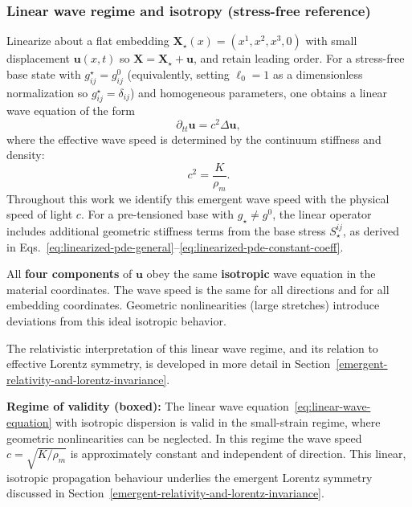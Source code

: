 \subsubsection{Linear wave regime and isotropy (stress-free reference)}\label{linear-wave-regime-and-isotropy}

Linearize about a flat embedding $\mathbf X_\star(x)=(x^1,x^2,x^3,0)$ with small displacement $\mathbf u(x,t)$ so $\mathbf X=\mathbf X_\star+\mathbf u$, and retain leading order. For a stress-free base state with $g^\star_{ij}=g^0_{ij}$ (equivalently, setting $\ell_0=1$ as a dimensionless normalization so $g^\star_{ij}=\delta_{ij}$) and homogeneous parameters, one obtains a linear wave equation of the form
\begin{equation}
\partial_{tt}\mathbf u = c^2\Delta\mathbf u,
\label{eq:linear-wave-equation}
\end{equation}
where the effective wave speed is determined by the continuum stiffness and density:
\begin{equation}
c^2 = \frac{K}{\rho_m}.
\end{equation}
Throughout this work we identify this emergent wave speed with the physical speed of light $c$.
For a pre-tensioned base with $g_\star\neq g^0$, the linear operator includes additional geometric stiffness terms from the base stress $S_\star^{ij}$, as derived in Eqs.~\eqref{eq:linearized-pde-general}--\eqref{eq:linearized-pde-constant-coeff}.

All \textbf{four components} of $\mathbf u$ obey the same \textbf{isotropic} wave equation in the material coordinates. The wave speed is the same for all directions and for all embedding coordinates. Geometric nonlinearities (large stretches) introduce deviations from this ideal isotropic behavior.

The relativistic interpretation of this linear wave regime, and its relation to
effective Lorentz symmetry, is developed in more detail in
Section~\ref{emergent-relativity-and-lorentz-invariance}.

\textbf{Regime of validity (boxed):}
The linear wave equation~\eqref{eq:linear-wave-equation} with isotropic
dispersion is valid in the small-strain regime, where geometric nonlinearities
can be neglected. In this regime the
wave speed $c=\sqrt{K/\rho_m}$ is approximately constant and independent of
direction. This linear, isotropic propagation behaviour underlies the emergent
Lorentz symmetry discussed in
Section~\ref{emergent-relativity-and-lorentz-invariance}.

